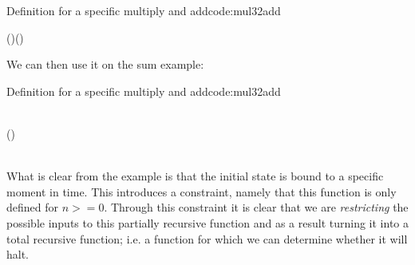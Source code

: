 \begin{texexptitled}{Definition for a specific multiply and add}{code:mul32add}
\begin{hscode}\SaveRestoreHook
{}%
%
\>[B]{}\leftarrow\mathbin{::}(\langle{}\rangle\to {}\langle{}\mathbin{-}\rangle\to {}\langle{}\rangle)\to (\langle{}\rangle\to {}\langle{}\rangle){}\<[E]%
\ColumnHook
\end{hscode}\resethooks
\end{texexptitled}
We can then use it on the sum example:
\begin{texexptitled}{Definition for a specific multiply and add}{code:mul32add}
\begin{hscode}\SaveRestoreHook
{}%
%
%
%
\>[B]{}\mathbin{::}\langle{}\rangle\to {}\langle{}\rangle{}\<[E]%
\\
\>[B]{}\;\mathrel{=}\;\leftarrow(\;\mathbin{::<}\rangle){}\<[E]%
\\
\>[B]{}\<[5]%
\>[5]{}\;{}\<[17]%
\>[17]{}\mathbin{::}\langle{}\rangle\to {}\langle{}\mathbin{-}\rangle\to {}\langle{}\rangle{}\<[E]%
\\
\>[17]{}\;\;\mathrel{=}\mathbin{+}\<[E]%
\ColumnHook
\end{hscode}\resethooks
\end{texexptitled}
What is clear from the example is that the initial state is bound to a specific moment in time. 
This introduces a constraint, namely that this function is only defined for $n >= 0$.
Through this constraint it is clear that we are \textit{restricting} the possible inputs to this partially recursive function and as a result turning it into a total recursive function; i.e. a function for which we can determine whether it will halt.

